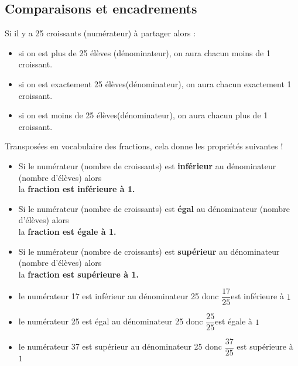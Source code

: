 \begin{changemargin}{0mm}{-15mm}
    \section{Comparaisons et encadrements}
    \begin{remarque}

        Si il y a 25 croissants (numérateur) à partager alors :
        \begin{itemize}
            \item si on est plus de 25 élèves (dénominateur), on aura chacun moins de 1 croissant.
            \item si on est exactement 25 élèves(dénominateur), on aura chacun exactement 1 croissant.
            \item si on est moins de 25 élèves(dénominateur), on aura chacun plus de 1 croissant.
        \end{itemize}
        Transposées en vocabulaire des fractions, cela donne les propriétés suivantes !
    \end{remarque}
\begin{propriete}[\admise]
    \begin{itemize}
        \item Si le numérateur (nombre de croissants) est \textbf{inférieur} au dénominateur (nombre d'élèves) alors \\la \textbf{fraction est inférieure à 1.}
        \item Si le numérateur (nombre de croissants) est \textbf{égal} au dénominateur (nombre d'élèves) alors \\la \textbf{fraction est égale à 1.}
        \item Si le numérateur (nombre de croissants) est \textbf{supérieur} au dénominateur (nombre d'élèves) alors \\la \textbf{fraction est supérieure à 1.}
    \end{itemize}
\end{propriete}
\begin{exemples*1} 
    \begin{itemize}
        \item le numérateur 17 est inférieur au dénominateur 25 donc $\dfrac{17}{25}$est inférieure à $1$
        \item le numérateur 25 est égal au dénominateur 25 donc $\dfrac{25}{25}$est égale à $1$
        \item le numérateur 37 est supérieur au dénominateur 25 donc $\dfrac{37}{25}$ est supérieure à $1$
    \end{itemize}
    \vspace*{-5mm}
\end{exemples*1} 


\end{changemargin}
